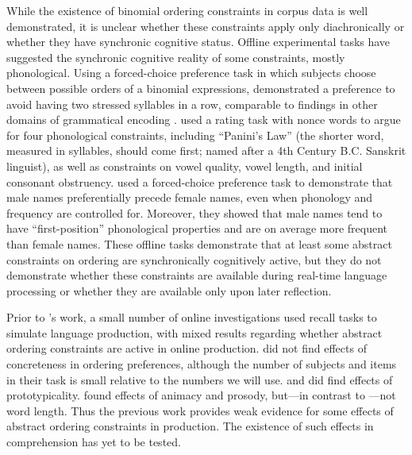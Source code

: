 \documentclass[authoryear]{elsarticle}
\begin{document}
While the existence of binomial ordering constraints in corpus data is well demonstrated, it is unclear whether these constraints apply only diachronically or whether they have synchronic cognitive status. Offline experimental tasks have suggested the synchronic cognitive reality of some constraints, mostly phonological. Using a forced-choice preference task in which subjects choose between possible orders of a binomial expressions, \citet{Bolinger:1962wc} demonstrated a preference to avoid having two stressed syllables in a row, comparable to findings in other domains of grammatical encoding \citep{Jaeger:ts,Lee:2007fm}. \citet{Pinker:1979tf} used a rating task with nonce words to argue for four phonological constraints, including ``Panini's Law'' (the shorter word, measured in syllables, should come first; named after a 4th Century B.C. Sanskrit linguist), as well as constraints on vowel quality, vowel length, and initial consonant obstruency. \cite{Wright:2005tc} used a forced-choice preference task to demonstrate that male names preferentially precede female names, even when phonology and frequency are controlled for. Moreover, they showed that male names tend to have ``first-position'' phonological properties and are on average more frequent than female names. These offline tasks demonstrate that at least some abstract constraints on ordering are synchronically cognitively active, but they do not demonstrate whether these constraints are available during real-time language processing or whether they are available only upon later reflection.


Prior to \citeauthor{SiyanovaChanturia:2011ep}'s work, a small number of online investigations used recall tasks to simulate language production, with mixed results regarding whether abstract ordering constraints are active in online production. \citet{Bock:1985vf} did not find effects of concreteness in ordering preferences, although the number of subjects and items in their task is small relative to the numbers we will use. \citet{Kelly:1986uc} and \citet{Onishi:2008cj} did find effects of prototypicality. \citet{McDonald:1993wq} found effects of animacy and prosody, but---in contrast to \citeauthor{Pinker:1979tf}---not word length. Thus the previous work provides weak evidence for some effects of abstract ordering constraints in production. The existence of such effects in comprehension has yet to be tested.
\end{document}
